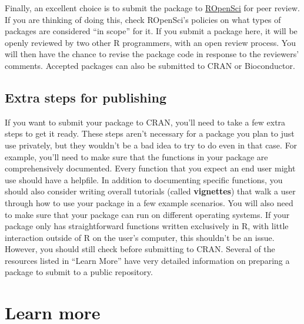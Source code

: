 \documentclass[]{tufte-book}
\begin{document}
Finally, an excellent choice is to submit the package to
\href{https://ropensci.org/}{ROpenSci} for peer review. If you are thinking of doing this,
check ROpenSci's policies on what types of packages are considered ``in scope'' for it.
If you submit a package here, it will be openly reviewed by two other R programmers,
with an open review process. You will then have the chance to revise the package
code in response to the reviewers' comments. Accepted packages can also be
submitted to CRAN or Bioconductor.

\hypertarget{extra-steps-for-publishing}{%
\subsection{Extra steps for publishing}\label{extra-steps-for-publishing}}

If you want to submit your package to CRAN, you'll need to take a few extra
steps to get it ready. These steps aren't necessary for a package you plan to
just use privately, but they wouldn't be a bad idea to try to do even in that
case. For example, you'll need to make sure that the functions in your package
are comprehensively documented. Every function that you expect an end user might
use should have a helpfile. In addition to documenting specific functions, you
should also consider writing overall tutorials (called \textbf{vignettes}) that walk
a user through how to use your package in a few example scenarios. You will also
need to make sure that your package can run on different operating systems. If
your package only has straightforward functions written exclusively in R, with
little interaction outside of R on the user's computer, this shouldn't be an
issue. However, you should still check before submitting to CRAN. Several of the
resources listed in ``Learn More'' have very detailed information on preparing a
package to submit to a public repository.

\hypertarget{learn-more-2}{%
\section{Learn more}\label{learn-more-2}}
\end{document}
